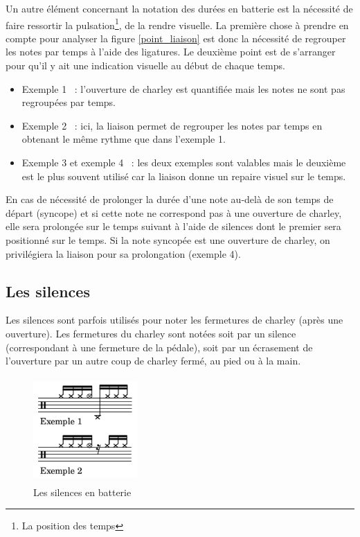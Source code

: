 Un autre élément concernant la notation des durées en batterie est la nécessité
de faire ressortir la pulsation\footnote{La position des temps}, de la rendre
visuelle. La première chose à prendre en compte pour analyser la figure
\ref{point_liaison} est donc la nécessité de regrouper les notes par temps à
l’aide des ligatures. Le deuxième point est de s’arranger pour qu’il y ait une
indication visuelle au début de chaque temps.

\begin{itemize}
    \item Exemple 1~ : l’ouverture de charley est quantifiée mais les notes ne
        sont pas regroupées par temps.
    \item Exemple 2~ : ici, la liaison permet de regrouper les notes par temps
        en obtenant le même rythme que dans l’exemple 1.
    \item Exemple 3 et exemple 4~ : les deux exemples sont valables mais le
        deuxième est le plus souvent utilisé car la liaison donne un repaire
        visuel sur le temps.\\
\end{itemize}

En cas de nécessité de prolonger la durée d’une note au-delà 
de son temps de départ (syncope) et si cette note ne correspond pas à une
ouverture de charley, elle sera prolongée sur le temps suivant à l’aide de
silences dont le premier sera positionné sur le temps. Si la note syncopée est
une ouverture de charley, on privilégiera la liaison pour sa prolongation (exemple 4).

\subsection*{Les silences}
Les silences sont parfois utilisés pour noter les fermetures de charley (après
une ouverture). Les fermetures du charley sont notées soit par un silence
(correspondant à une fermeture de la pédale), soit par un écrasement de
l’ouverture par un autre coup de charley fermé, au pied ou à la main.

\begin{figure}[h]
	\centering
	\includegraphics[height=40mm, width=40mm]{
    z_images/3_methodes/0_notation_de_la_batterie/5_silence_joue.png}
	\caption{Les silences en batterie}
	\label{silence joue}
\end{figure}

